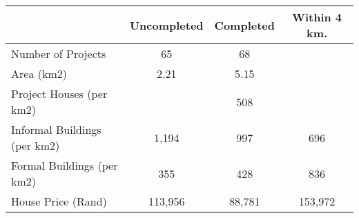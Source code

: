 \begin{tabular}{l*{1}{ccc}}
 &Uncompleted &Completed &Within 4 km.  \\
\hline 
Number of Projects &         65 &         68 &   \\
Area (km2) &       2.21 &       5.15 &   \\
Project Houses (per km2) &  &        508 &   \\
Informal Buildings (per km2) &      1,194 &        997 &        696  \\
Formal Buildings (per km2) &        355 &        428 &        836  \\
House Price (Rand) &    113,956 &     88,781 &    153,972  \\
\hline
\end{tabular}